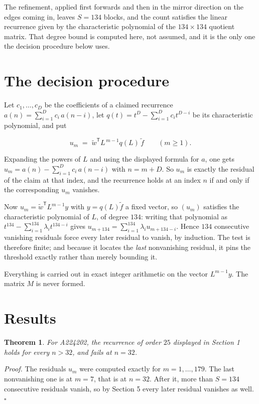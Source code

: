\documentclass[11pt]{article}
\newtheorem{theorem}{Theorem}
\theoremstyle{definition}
\begin{document}
The refinement, applied first forwards and then in the mirror direction on the edges coming in, leaves $S = 134$ blocks, and the count satisfies the linear recurrence given by the characteristic polynomial of the $134 \times 134$ quotient matrix. That degree bound is computed here, not assumed, and it is the only one the decision procedure below uses.

\section{The decision procedure}

Let $c_1,\dots,c_D$ be the coefficients of a claimed recurrence $a(n) = \sum_{i=1}^{D} c_i\,a(n-i)$, let $q(t) = t^{D} - \sum_{i=1}^{D} c_i t^{D-i}$ be its characteristic polynomial, and put

\[u_m \;=\; \tilde w^{\mathsf T} L^{\,m-1} q(L)\,\tilde f \qquad (m \ge 1).\]

Expanding the powers of $L$ and using the displayed formula for $a$, one gets $u_m = a(n) - \sum_{i=1}^{D} c_i\,a(n-i)$ with $n = m + D$. So $u_m$ is exactly the residual of the claim at that index, and the recurrence holds at an index $n$ if and only if the corresponding $u_m$ vanishes.

Now $u_m = \tilde w^{\mathsf T} L^{m-1} y$ with $y = q(L)\tilde f$ a fixed vector, so $(u_m)$ satisfies the characteristic polynomial of $L$, of degree $134$: writing that polynomial as $t^{134} - \sum_{i=1}^{134} \lambda_i t^{134-i}$ gives $u_{m+134} = \sum_{i=1}^{134} \lambda_i u_{m+134-i}$. Hence $134$ consecutive vanishing residuals force every later residual to vanish, by induction. The test is therefore finite; and because it locates the {\itshape last} nonvanishing residual, it pins the threshold exactly rather than merely bounding it.

Everything is carried out in exact integer arithmetic on the vector $L^{m-1}y$. The matrix $M$ is never formed.

\section{Results}

\begin{theorem} For A224202, the recurrence of order $25$ displayed in Section 1 holds for every $n > 32$, and fails at $n = 32$.\end{theorem}

{\itshape Proof.} The residuals $u_m$ were computed exactly for $m = 1,\dots,179$. The last nonvanishing one is at $m = 7$, that is at $n = 32$. After it, more than $S = 134$ consecutive residuals vanish, so by Section 5 every later residual vanishes as well. $\square$
\end{document}
